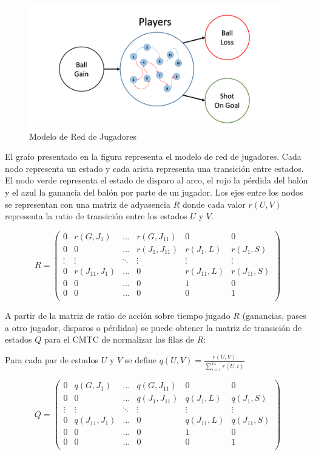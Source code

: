 \documentclass[
  a4paper,
]{article}
\begin{document}
\begin{figure}
  \includegraphics{recursos_pdf/graficos/soccer_network.png}
    \caption{Modelo de Red de Jugadores}
\end{figure}

El grafo presentado en la figura representa el modelo de red de
jugadores. Cada nodo representa un estado y cada arista representa una
transición entre estados. El nodo verde representa el estado de disparo
al arco, el rojo la pérdida del balón y el azul la ganancia del balón
por parte de un jugador. Los ejes entre los nodos se representan con una
matriz de adyasencia \(R\) donde cada valor \(r(U, V)\) representa la
ratio de transición entre los estados \(U\) y \(V\).

\[
    R = \begin{pmatrix}
        0 & r(G, J_{1}) & \dots & r(G, J_{11}) & 0 & 0 \\
        0 & 0 & \dots & r(J_{1}, J_{11}) & r(J_{1}, L) & r(J_{1}, S) \\
        \vdots & \vdots & \ddots & \vdots & \vdots & \vdots \\
        0 & r(J_{11}, J_{1}) & \dots & 0 & r(J_{11}, L) & r(J_{11}, S) \\
        0 & 0 & \dots & 0 & 1 & 0 \\
        0 & 0 & \dots & 0 & 0 & 1 \\
    \end{pmatrix}
\]

A partir de la matriz de ratio de acción sobre tiempo jugado \(R\)
(ganancias, pases a otro jugador, disparos o pérdidas) se puede obtener
la matriz de transición de estados \(Q\) para el CMTC de normalizar las
filas de \(R\):

Para cada par de estados \(U\) y \(V\) se define
\(q(U, V) = \frac{r(U, V)}{\sum_{i=1}^{14} r(U, i)}\)

\[
    Q = \begin{pmatrix}
        0 & q(G, J_{1}) & \dots & q(G, J_{11}) & 0 & 0 \\
        0 & 0 & \dots & q(J_{1}, J_{11}) & q(J_{1}, L) & q(J_{1}, S) \\
        \vdots & \vdots & \ddots & \vdots & \vdots & \vdots \\
        0 & q(J_{11}, J_{1}) & \dots & 0 & q(J_{11}, L) & q(J_{11}, S) \\
        0 & 0 & \dots & 0 & 1 & 0 \\
        0 & 0 & \dots & 0 & 0 & 1 \\
    \end{pmatrix}
\]
\end{document}
